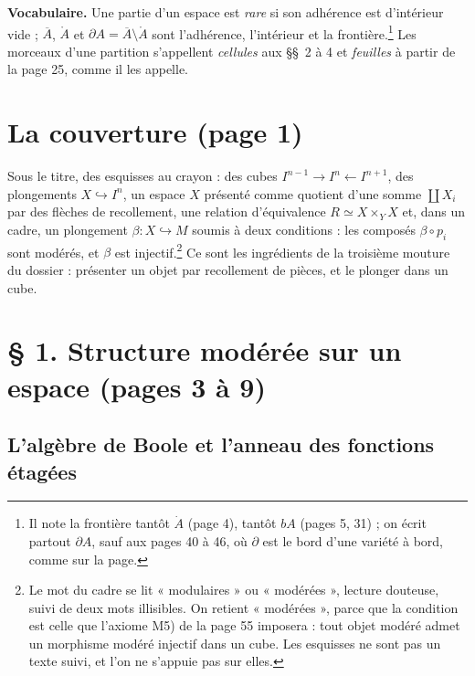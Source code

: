 \documentclass[11pt,a4paper]{article}
\begin{document}
\textbf{Vocabulaire.} Une partie d'un espace est \emph{rare} si son adhérence
est d'intérieur vide ; $\overline{A}$, $\mathring{A}$ et
$\partial A = \overline{A} \setminus \mathring{A}$ sont l'adhérence,
l'intérieur et la frontière.\footnote{Il note la frontière tantôt $\dot{A}$
(page 4), tantôt $bA$ (pages 5, 31) ; on écrit partout $\partial A$, sauf aux
pages 40 à 46, où $\partial$ est le bord d'une variété à bord, comme sur la
page.} Les morceaux d'une partition s'appellent \emph{cellules} aux §§~2 à 4
et \emph{feuilles} à partir de la page 25, comme il les appelle.

\section*{La couverture (page 1)}

Sous le titre, des esquisses au crayon : des cubes $I^{n-1} \to I^n \leftarrow
I^{n+1}$, des plongements $X \hookrightarrow I^n$, un espace $X$ présenté comme
quotient d'une somme $\coprod X_i$ par des flèches de recollement, une
relation d'équivalence $R \simeq X \times_Y X$ et, dans un cadre, un
plongement $\beta : X \hookrightarrow M$ soumis à deux conditions : les
composés $\beta \circ p_i$ sont modérés, et $\beta$ est injectif.\footnote{Le
mot du cadre se lit « modulaires » ou « modérées », lecture douteuse, suivi de
deux mots illisibles. On retient « modérées », parce que la condition est
celle que l'axiome M5) de la page 55 imposera : tout objet modéré admet un
morphisme modéré injectif dans un cube. Les esquisses ne sont pas un texte
suivi, et l'on ne s'appuie pas sur elles.} Ce sont les ingrédients de la
troisième mouture du dossier : présenter un objet par recollement de pièces, et
le plonger dans un cube.

\section*{§ 1. Structure modérée sur un espace (pages 3 à 9)}

\subsection*{L'algèbre de Boole et l'anneau des fonctions étagées}
\end{document}
